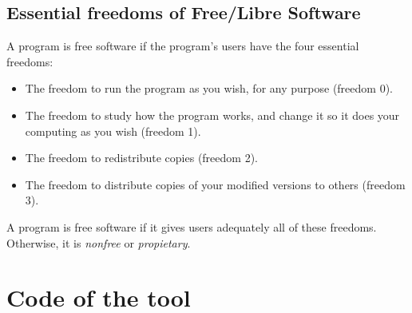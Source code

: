 \documentclass[a4paper, 12pt]{book}
\begin{document}
\section{Essential freedoms of Free/Libre Software}
\label{sec:freedoms}
A program is free software if the program's users have the four essential freedoms:
\begin{itemize}
   \item The freedom to run the program as you wish, for any purpose (freedom 0).
   \item The freedom to study how the program works, and change it so it does your computing as you wish (freedom 1).
   \item The freedom to redistribute copies (freedom 2).
   \item The freedom to distribute copies of your modified versions to others (freedom 3).
\end{itemize}
A program is free software if it gives users adequately all of these freedoms. Otherwise, it is \textit{nonfree} or \textit{propietary}.
\chapter{Code of the tool}
\label{app:code}

\end{document}
